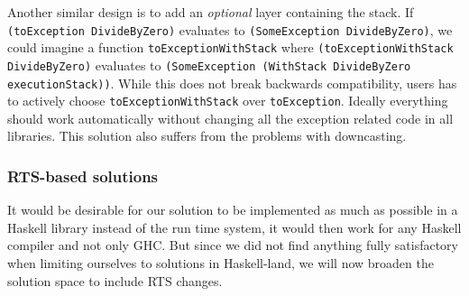 Another similar design is to add an \emph{optional} layer containing
the stack. If \texttt{(toException DivideByZero)} evaluates to
\texttt{(SomeException DivideByZero)}, we could imagine a function
\texttt{toExceptionWithStack} where \texttt{(toExceptionWithStack
DivideByZero)} evaluates to \texttt{(SomeException (WithStack
DivideByZero executionStack))}. While this does not break backwards
compatibility, users has to actively choose
\texttt{toExceptionWithStack} over \texttt{toException}. Ideally
everything should work automatically without changing all the exception
related code in all libraries. This solution also suffers from the
problems with downcasting.

\subsubsection{RTS-based solutions}



It would be desirable for our solution to be implemented as much
as possible in a Haskell library instead of the run time system, it
would then work for any Haskell compiler and not only GHC. But since we
did not find anything fully satisfactory when limiting ourselves to
solutions in Haskell-land, we will now broaden the solution space to
include RTS changes.



